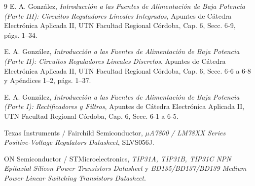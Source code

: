 \documentclass{plantilla}
\begin{document}
\begin{thebibliography}{9}
E. A. González, \emph{Introducción a las Fuentes de Alimentación de Baja Potencia (Parte III): Circuitos Reguladores Lineales Integrados}, Apuntes de Cátedra Electrónica Aplicada II, UTN Facultad Regional Córdoba, Cap. 6, Secc. 6-9, págs. 1--34.

E. A. González, \emph{Introducción a las Fuentes de Alimentación de Baja Potencia (Parte II): Circuitos Reguladores Lineales Discretos}, Apuntes de Cátedra Electrónica Aplicada II, UTN Facultad Regional Córdoba, Cap. 6, Secc. 6-6 a 6-8 y Apéndices 1--2, págs. 1--37.

E. A. González, \emph{Introducción a las Fuentes de Alimentación de Baja Potencia (Parte I): Rectificadores y Filtros}, Apuntes de Cátedra Electrónica Aplicada II, UTN Facultad Regional Córdoba, Cap. 6, Secc. 6-1 a 6-5.

Texas Instruments / Fairchild Semiconductor, \emph{$\mu$A7800 / LM78XX Series Positive-Voltage Regulators Datasheet}, SLVS056J.

ON Semiconductor / STMicroelectronics, \emph{TIP31A, TIP31B, TIP31C NPN Epitaxial Silicon Power Transistors Datasheet} y \emph{BD135/BD137/BD139 Medium Power Linear Switching Transistors Datasheet}.
\end{thebibliography}
\end{document}
